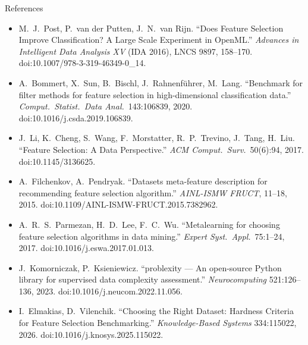 \documentclass[aspectratio=169,10pt,dvipsnames]{beamer}
\begin{document}
\begin{frame}{References}
\footnotesize
\begin{itemize}\setlength{\itemsep}{3pt}
  \item M.\ J.\ Post, P.\ van der Putten, J.\ N.\ van Rijn.
        ``Does Feature Selection Improve Classification? A Large Scale Experiment
        in OpenML.'' \emph{Advances in Intelligent Data Analysis XV} (IDA 2016),
        LNCS 9897, 158--170. doi:10.1007/978-3-319-46349-0\_14.
  \item A.\ Bommert, X.\ Sun, B.\ Bischl, J.\ Rahnenf\"uhrer, M.\ Lang.
        ``Benchmark for filter methods for feature selection in high-dimensional
        classification data.'' \emph{Comput.\ Statist.\ Data Anal.}\ 143:106839,
        2020. doi:10.1016/j.csda.2019.106839.
  \item J.\ Li, K.\ Cheng, S.\ Wang, F.\ Morstatter, R.\ P.\ Trevino, J.\ Tang,
        H.\ Liu. ``Feature Selection: A Data Perspective.''
        \emph{ACM Comput.\ Surv.}\ 50(6):94, 2017. doi:10.1145/3136625.
  \item A.\ Filchenkov, A.\ Pendryak. ``Datasets meta-feature description for
        recommending feature selection algorithm.''
        \emph{AINL-ISMW FRUCT}, 11--18, 2015.
        doi:10.1109/AINL-ISMW-FRUCT.2015.7382962.
  \item A.\ R.\ S.\ Parmezan, H.\ D.\ Lee, F.\ C.\ Wu. ``Metalearning for choosing
        feature selection algorithms in data mining.''
        \emph{Expert Syst.\ Appl.}\ 75:1--24, 2017. doi:10.1016/j.eswa.2017.01.013.
  \item J.\ Komorniczak, P.\ Ksieniewicz. ``problexity --- An open-source Python
        library for supervised data complexity assessment.''
        \emph{Neurocomputing} 521:126--136, 2023. doi:10.1016/j.neucom.2022.11.056.
  \item I.\ Elmakias, D.\ Vilenchik. ``Choosing the Right Dataset: Hardness
        Criteria for Feature Selection Benchmarking.''
        \emph{Knowledge-Based Systems} 334:115022, 2026.
        doi:10.1016/j.knosys.2025.115022.
\end{itemize}
\end{frame}
\end{document}
